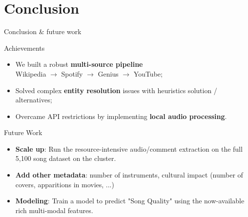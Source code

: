 \documentclass{beamer}
\begin{document}
\section*{Conclusion}
\begin{frame}{Conclusion \& future work}
    \begin{block}{Achievements}
        \begin{itemize}
            \item We built a robust \textbf{multi-source pipeline}\\ Wikipedia $\rightarrow$ Spotify $\rightarrow$ Genius $\rightarrow$ YouTube;
            \item Solved complex \textbf{entity resolution} issues with heuristics solution / alternatives;
            \item Overcame API restrictions by implementing \textbf{local audio processing}.
        \end{itemize}
    \end{block}

    
    \begin{block}{Future Work}
        \begin{itemize}
            \item \textbf{Scale up}: Run the resource-intensive audio/comment extraction on the full 5,100 song dataset on the cluster.
            \item \textbf{Add other metadata}: number of instruments, cultural impact (number of covers, apparitions in movies, ...)
            \item \textbf{Modeling}: Train a model to predict "Song Quality" using the now-available rich multi-modal features.
        \end{itemize}
    \end{block}
\end{frame}
\end{document}
